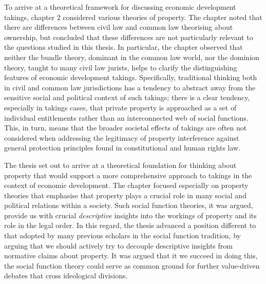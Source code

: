 
To arrive at a theoretical framework for discussing economic development takings, chapter 2 considered various theories of property. The chapter noted that there are differences between civil law and common law theorising about ownership, but concluded that these differences are not particularly relevant to the questions studied in this thesis. In particular, the chapter observed that neither the bundle theory, dominant in the common law world, nor the dominion theory, taught to many civil law jurists, helps to clarify the distinguishing features of economic development takings. Specifically, traditional thinking both in civil and common law jurisdictions has a tendency to abstract away from the sensitive social and political context of such takings; there is a clear tendency, especially in takings cases, that private property is approached as a set of individual entitlements rather than an interconnected web of social functions. This, in turn, means that the broader societal effects of takings are often not considered when addressing the legitimacy of property interference against general protection principles found in constitutional and human rights law.

The thesis set out to arrive at a theoretical foundation for thinking about property that would support a more comprehensive approach to takings in the context of economic development. The chapter focused especially on property theories that emphasise that property plays a crucial role in many social and political relations within a society. Such social function theories, it was argued, provide us with crucial {\it descriptive} insights into the workings of property and its role in the legal order. In this regard, the thesis advanced a position different to that adopted by many previous scholars in the social function tradition, by arguing that we should actively try to decouple descriptive insights from normative claims about property. It was argued that it we succeed in doing this, the social function theory could serve as  common ground for further value-driven debates that cross ideological divisions.

